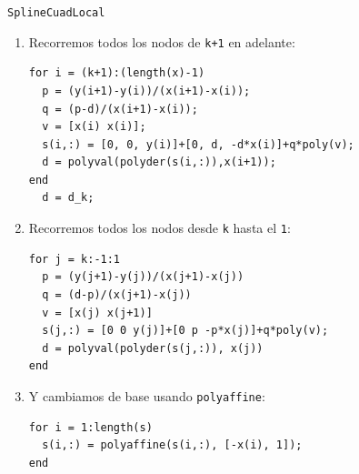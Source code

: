 \documentclass[compress]{beamer}
\theoremstyle{definition}
\begin{document}
\begin{frame}[fragile]{\texttt{SplineCuadLocal}}
\begin{enumerate}[<only@+>]

\item Recorremos todos los nodos de \texttt{k+1} en adelante:
\begin{lstlisting}
for i = (k+1):(length(x)-1)
  p = (y(i+1)-y(i))/(x(i+1)-x(i));
  q = (p-d)/(x(i+1)-x(i));
  v = [x(i) x(i)];
  s(i,:) = [0, 0, y(i)]+[0, d, -d*x(i)]+q*poly(v);
  d = polyval(polyder(s(i,:)),x(i+1));
end
  d = d_k;
\end{lstlisting}

\item Recorremos todos los nodos desde \texttt{k} hasta el \texttt{1}:
\begin{lstlisting}
for j = k:-1:1
  p = (y(j+1)-y(j))/(x(j+1)-x(j))
  q = (d-p)/(x(j+1)-x(j))
  v = [x(j) x(j+1)]
  s(j,:) = [0 0 y(j)]+[0 p -p*x(j)]+q*poly(v);
  d = polyval(polyder(s(j,:)), x(j))
end
\end{lstlisting}

\item Y cambiamos de base usando \texttt{polyaffine}:
\begin{lstlisting}
for i = 1:length(s)
  s(i,:) = polyaffine(s(i,:), [-x(i), 1]);
end
\end{lstlisting}
\end{enumerate}
\end{frame}
\end{document}
